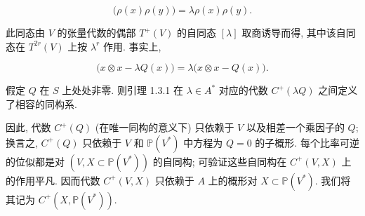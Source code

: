 \begin{equation*}
[\lambda]\bigl(\rho(x)\rho(y)\bigr)
=\lambda\rho(x)\rho(y).
\end{equation*}


此同态由 $V$ 的张量代数的偶部 $T^+(V)$ 的自同态 $[\lambda]$ 取商诱导而得, 其中该自同态在 $T^{2r}(V)$ 上按 $\lambda^r$ 作用. 事实上,

\begin{equation*}
[\lambda]\bigl(x\otimes x-\lambda Q(x)\bigr)
=\lambda\bigl(x\otimes x-Q(x)\bigr).
\end{equation*}

假定 $Q$ 在 $S$ 上处处非零. 则引理 1.3.1 在 $\lambda\in A^*$ 对应的代数 $C^+(\lambda Q)$ 之间定义了相容的同构系.

因此, 代数 $C^+(Q)$ (在唯一同构的意义下) 只依赖于 $V$ 以及相差一个乘因子的 $Q$; 换言之, $C^+(Q)$ 只依赖于 $V$ 和 $\mathbb P(V^*)$ 中方程为 $Q=0$ 的子概形. 每个比率可逆的位似都是对 $(V,X\subset\mathbb P(V^*))$ 的自同构; 可验证这些自同构在 $C^+(V,X)$ 上的作用平凡. 因而代数 $C^+(V,X)$ 只依赖于 $A$ 上的概形对 $X\subset\mathbb P(V^*)$. 我们将其记为 $C^+(X,\mathbb P(V^*))$.
